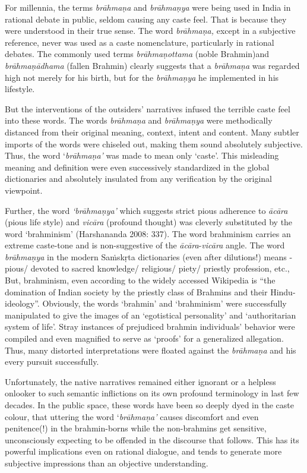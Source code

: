 For millennia, the terms \textit{brāhmaṇa} and \textit{brāhmaṇya} were being used in India in rational debate in public, seldom causing any caste feel. That is because they were understood in their true sense. The word \textit{brāhmaṇa,} except in a subjective reference, never was used as a caste nomenclature, particularly in rational debates. The commonly used terms \textit{brāhmaṇottama} (noble Brahmin)and \textit{brāhmaṇādhama} (fallen Brahmin) clearly suggests that a \textit{brāhmaṇa} was regarded high not merely for his birth, but for the \textit{brāhmaṇya} he implemented in his lifestyle.

But the interventions of the outsiders’ narratives infused the terrible caste feel into these words. The words \textit{brāhmaṇa} and \textit{brāhmaṇya} were methodically distanced from their original meaning, context, intent and content. Many subtler imports of the words were chiseled out, making them sound absolutely subjective. Thus, the word ‘\textit{brāhmaṇa’} was made to mean only ‘caste’. This misleading meaning and definition were even successively standardized in the global dictionaries and absolutely insulated from any verification by the original viewpoint.

Further\textit{,} the word\textit{ ‘brāhmaṇya’} which suggests strict pious adherence to \textit{ācāra} (pious life style) and \textit{vicāra} (profound thought) was cleverly substituted by the word ‘brahminism’ (Harshananda 2008: 337). The word brahminism carries an extreme caste-tone and is non-suggestive of the \textit{ācāra}-\textit{vicāra} angle. The word \textit{brāhmaṇya} in the modern Saṁskṛta dictionaries (even after dilutions!) means - pious/ devoted to sacred knowledge/ religious/ piety/ priestly profession, etc., But, brahminism, even according to the widely accessed Wikipedia is “the domination of Indian society by the priestly class of Brahmins and their Hindu-ideology”. Obviously, the words ‘brahmin’ and ‘brahminism’ were successfully manipulated to give the images of an ‘egotistical personality’ and ‘authoritarian system of life’. Stray instances of prejudiced brahmin individuals’ behavior were compiled and even magnified to serve as ‘proofs’ for a generalized allegation. Thus, many distorted interpretations were floated against the \textit{brāhmaṇa} and his every pursuit successfully.

Unfortunately, the native narratives remained either ignorant or a helpless onlooker to such semantic inflictions on its own profound terminology in last few decades. In the public space, these words have been so deeply dyed in the caste colour, that uttering the word ‘\textit{brāhmaṇa’} causes discomfort and even penitence(!) in the brahmin-borns while the non-brahmins get sensitive, unconsciously expecting to be offended in the discourse that follows. This has its powerful implications even on rational dialogue, and tends to generate more subjective impressions than an objective understanding.

